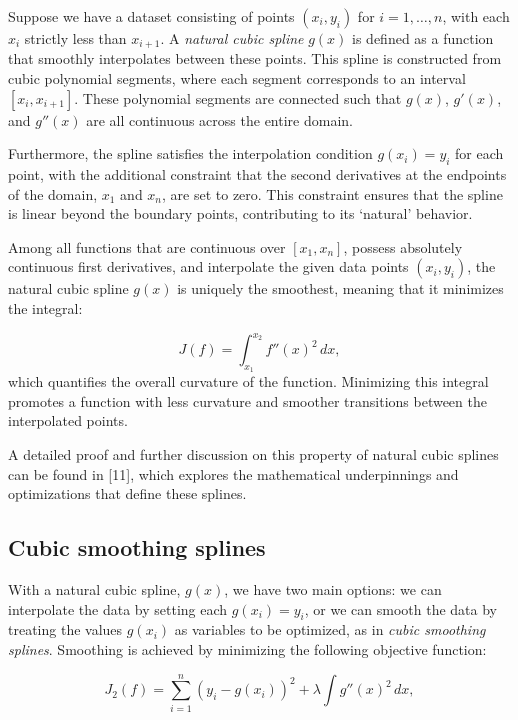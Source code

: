 \documentclass[
11pt, %
oneside, %
english, %
singlespacing, %
]{macthesis} %
\begin{document}
Suppose we have a dataset consisting of points \((x_i, y_i)\) for \(i = 1, \ldots, n\), with each \(x_i\) strictly less than \(x_{i+1}\). A \emph{natural cubic spline} \(g(x)\) is defined as a function that smoothly interpolates between these points. This spline is constructed from cubic polynomial segments, where each segment corresponds to an interval \([x_i, x_{i+1}]\). These polynomial segments are connected such that \(g(x)\), \(g'(x)\), and \(g''(x)\) are all continuous across the entire domain.

Furthermore, the spline satisfies the interpolation condition \(g(x_i) = y_i\) for each point, with the additional constraint that the second derivatives at the endpoints of the domain, \(x_1\) and \(x_n\), are set to zero. This constraint ensures that the spline is linear beyond the boundary points, contributing to its `natural' behavior.

Among all functions that are continuous over \([x_1, x_n]\), possess absolutely continuous first derivatives, and interpolate the given data points \((x_i, y_i)\), the natural cubic spline \(g(x)\) is uniquely the smoothest, meaning that it minimizes the integral:

\begin{equation}
J(f) = \int_{x_{1}}^{x_{2}} f''(x)^{2}\,dx,
\label{eq:min_smoothness}
\end{equation}
which quantifies the overall curvature of the function. Minimizing this integral promotes a function with less curvature and smoother transitions between the interpolated points.

A detailed proof and further discussion on this property of natural cubic splines can be found in {[}11{]}, which explores the mathematical underpinnings and optimizations that define these splines.

\subsection{Cubic smoothing splines}\label{Cubic-smoothing-splines}

With a natural cubic spline, \(g(x)\), we have two main options: we can interpolate the data by setting each \(g(x_i) = y_i\), or we can smooth the data by treating the values \(g(x_i)\) as variables to be optimized, as in \emph{cubic smoothing splines}. Smoothing is achieved by minimizing the following objective function:

\begin{equation}
J_{2}(f) = \sum_{i=1}^n (y_i - g(x_i))^2 + \lambda \int g''(x)^2 \, dx,
\label{eq:min_smoothness_obj}
\end{equation}
\end{document}
